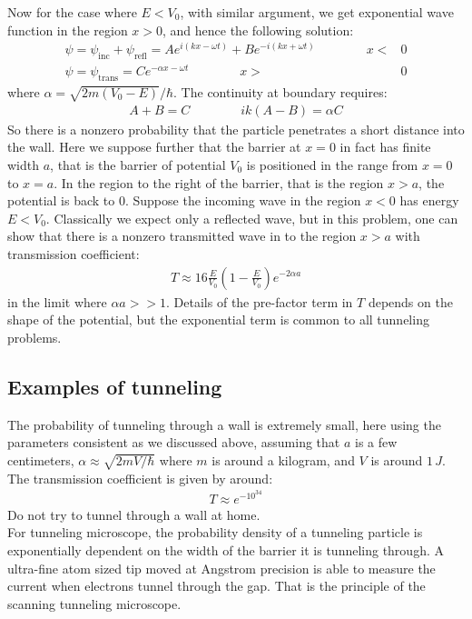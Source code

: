 \documentclass[11pt]{article}
\theoremstyle{break}
\theoremstyle{break}
\begin{document}
Now for the case where $E<V_0$, with similar argument, we get exponential wave function in the region $x>0$, and hence the following solution:
\begin{align*}
\psi = \psi_{\text{inc}} + \psi_{\text{refl}} =  Ae^{i(kx - \omega t)} + Be^{-i (kx + \omega t)} \qquad\qquad x<&0 \\
\psi = \psi_{\text{trans}} = Ce^{-\alpha x - \omega t} \qquad\qquad x>&0 \tag{$E<V_0$}
\end{align*}
where $\alpha = \sqrt{2m(V_0-E)}/\hbar$. The continuity at boundary requires:
\begin{align*}
A+B = C \qquad\qquad ik(A-B) = \alpha C  \tag{$E<V_0$}
\end{align*}
So there is a nonzero probability that the particle penetrates a short distance into the wall. Here we suppose further that the barrier at $x=0$ in fact has finite width $a$, that is the barrier of potential $V_0$ is positioned in the range from $x=0$ to $x=a$. In the region to the right of the barrier, that is the region $x>a$, the potential is back to $0$. Suppose the incoming wave in the region $x<0$ has energy $E<V_0$. Classically we expect only a reflected wave, but in this problem, one can show that there is a nonzero transmitted wave in to the region $x>a$ with transmission coefficient:
\begin{align*}
T \approx 16 \frac{E}{V_0} \left( 1 - \frac{E}{V_0}\right) e^{-2\alpha a} \tag{$E<V_0$}
\end{align*}
in the limit where $\alpha a >>1$. Details of the pre-factor term in $T$ depends on the shape of the potential, but the exponential term is common to all tunneling problems. \\

\subsection{Examples of tunneling}
The probability of tunneling through a wall is extremely small, here using the parameters consistent as we discussed above, assuming that $a$ is a few centimeters, $\alpha \approx \sqrt{2m V/\hbar}$ where $m$ is around a kilogram, and $V$ is around $1 \, J$. The transmission coefficient is given by around:
\begin{align*}
T \approx e^{-10^{34}}
\end{align*}
Do not try to tunnel through a wall at home.\\

For tunneling microscope, the probability density of a tunneling particle is exponentially dependent on the width of the barrier it is tunneling through. A ultra-fine atom sized tip moved at Angstrom precision is able to measure the current when electrons tunnel through the gap. That is the principle of the scanning tunneling microscope.\\
\end{document}

